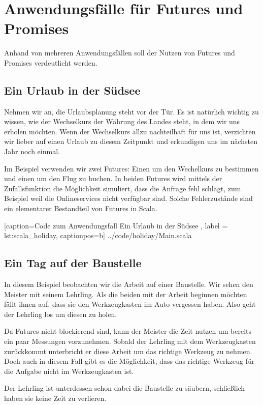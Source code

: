 \documentclass[11pt,a4paper,titlepage,ngerman]{scrartcl}
\begin{document}
\section{Anwendungsfälle für Futures und Promises}

Anhand von mehreren Anwendungsfällen soll der Nutzen von Futures und Promises
verdeutlicht werden. 

\subsection{Ein Urlaub in der Südsee}

Nehmen wir an, die Urlaubsplanung steht vor der Tür. Es ist natürlich wichtig
zu wissen, wie der Wechselkurs der Währung des Landes steht, in dem wir uns
erholen möchten. Wenn der Wechselkurs allzu nachteilhaft für uns ist,
verzichten wir lieber auf einen Urlaub zu diesem Zeitpunkt und erkundigen
uns im nächsten Jahr noch einmal.

Im Beispiel verwenden wir zwei Futures: Einen um den Wechelkurs zu bestimmen
und einen um den Flug zu buchen. In beiden Futures wird mittels der Zufallsfunktion
die Möglichkeit simuliert, dass die Anfrage fehl schlägt, zum Beispiel weil
die Onlineservices nicht verfügbar sind. Solche Fehlerzustände sind ein elementarer
Bestandteil von Futures in Scala.


    [caption={Code zum Anwendungsfall \glqq Ein Urlaub in der Südsee\grqq{} },
       label = lst:scala_holiday,
       captionpos=b]
 {../code/holiday/Main.scala}
 

\subsection{Ein Tag auf der Baustelle}

In diesem Beispiel beobachten wir die Arbeit auf einer Baustelle. Wir sehen
den Meister mit seinem Lehrling. Als die beiden mit der Arbeit beginnen möchten
fällt ihnen auf, dass sie den Werkzeugkasten im Auto vergessen haben. Also
geht der Lehrling los um diesen zu holen.

Da Futures nicht blockierend sind, kann der Meister die Zeit nutzen um bereits
ein paar Messungen vorzunehmen. Sobald der Lehrling mit dem Werkzeugkasten
zurückkommt unterbricht er diese Arbeit um das richtige Werkzeug zu nehmen.
Doch auch in diesem Fall gibt es die Möglichkeit, dass das richtige Werkzeug
für die Aufgabe nicht im Werkzeugkasten ist.

Der Lehrling ist unterdessen schon dabei die Baustelle zu säubern, schließlich
haben sie keine Zeit zu verlieren.
\end{document}
